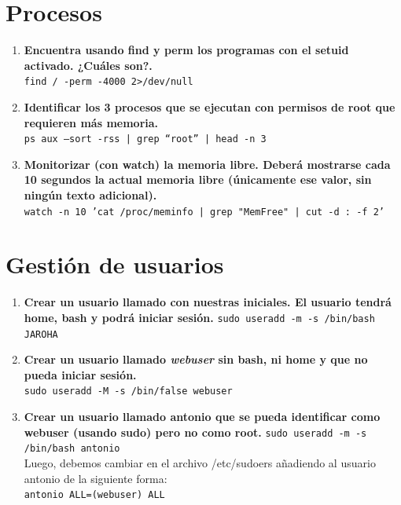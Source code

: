\documentclass[12pt,letterpaper]{article}
\begin{document}
\section{Procesos}
\begin{enumerate}
	\item \textbf{Encuentra usando find y perm los programas con el setuid activado. ¿Cuáles son?.} \\ 
	\texttt{find / -perm -4000 2>/dev/null}
	\item \textbf{Identificar los 3 procesos que se ejecutan con permisos de root que requieren más memoria.} \\
	\texttt{ps aux --sort -rss | grep ``root'' | head -n 3}
	\item \textbf{Monitorizar (con watch) la memoria libre. Deberá mostrarse cada 10 segundos la actual memoria libre (únicamente ese valor, sin ningún texto adicional).} \\
	\texttt{watch -n 10 'cat /proc/meminfo | grep "MemFree" | cut -d : -f 2'}
\end{enumerate}

\section{Gestión de usuarios}
\begin{enumerate}
	\item \textbf{Crear un usuario llamado con nuestras iniciales. El usuario tendrá home, bash y podrá iniciar sesión.}
	\texttt{sudo useradd -m -s /bin/bash JAROHA}
	\item \textbf{Crear un usuario llamado \textit{webuser} sin bash, ni home y que no pueda iniciar sesión.} \\
	\texttt{sudo useradd -M -s /bin/false webuser}
	\item \textbf{Crear un usuario llamado antonio que se pueda identificar como webuser (usando sudo) pero no como root.}
	\texttt{sudo useradd -m -s /bin/bash antonio} \\
	Luego, debemos cambiar en el archivo /etc/sudoers añadiendo al usuario antonio de la siguiente forma: \\
	\texttt{antonio ALL=(webuser) ALL}
\end{enumerate}
\end{document}
